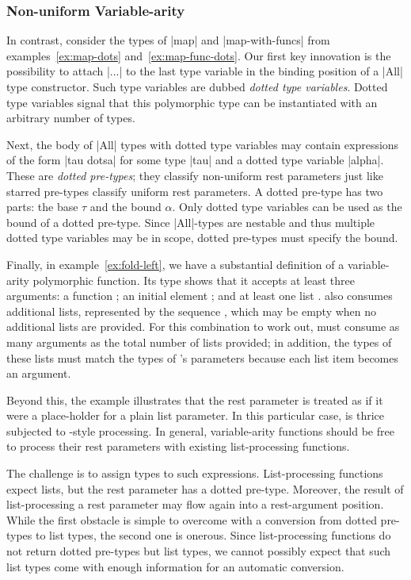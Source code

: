 \begin{schemeregion}
\subsubsection{Non-uniform Variable-arity}

In contrast, consider the types of \scheme|map| and \scheme|map-with-funcs|
from examples~\ref{ex:map-dots} and~\ref{ex:map-func-dots}.  
Our first key innovation is the possibility to attach \scheme|...| to the last
type variable in the binding position of a \scheme|All| type constructor.
Such type variables are dubbed {\em dotted type variables}.  Dotted type
variables signal that this polymorphic type can be instantiated with an arbitrary
number of types.

Next, the body of \scheme|All| types with dotted type variables may contain
 expressions of the form \scheme|tau dotsa| for some type \scheme|tau| and
 a dotted type variable \scheme|alpha|.  These are {\em dotted pre-types};
 they classify non-uniform rest parameters just like starred pre-types classify
 uniform rest parameters.  A dotted pre-type has two parts: the base $\tau$
 and the bound $\alpha$.  Only dotted type variables can be used as the
 bound of a dotted pre-type. Since \scheme|All|-types are
 nestable and thus multiple dotted type variables may be in scope,
 dotted pre-types must specify the bound.

Finally, in example~\ref{ex:fold-left}, we have a substantial
definition of a variable-arity polymorphic function. Its type shows
that it accepts at least three arguments: a 
 function ; an initial element ;
 and at least one list . 
  also consumes additional lists, represented by the
 sequence , which may be empty when no additional lists
 are provided. For
 this combination to work out,  must consume as many arguments as
 the total number of lists provided; in addition, the types of these
 lists must match 
 the types of 's parameters because each list item 
 becomes an argument. 

Beyond this, the example illustrates that the rest parameter is treated as
 if it were a place-holder for a plain list parameter. In this particular
 case,  is thrice subjected to -style processing.
 In general, variable-arity functions should be free to process their rest
 parameters with existing list-processing functions. 

The challenge is to assign types to such expressions. 
 List-processing functions expect lists, but the rest parameter has a
 dotted pre-type. Moreover, the result of list-processing a rest
 parameter may flow again into a rest-argument position. While the first
 obstacle is simple to overcome with a conversion from dotted
 pre-types to list types, the second one is onerous. Since
 list-processing functions do not return dotted pre-types but list types,
 we cannot possibly expect that such list types come with enough
 information for an automatic conversion. 


\end{schemeregion}

